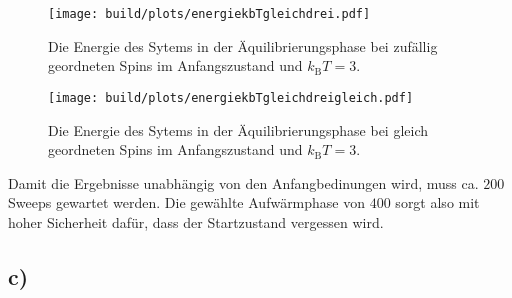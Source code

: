     \begin{figure*}
            \centering
            \begin{subfigure}[b]{0.475\textwidth}
                \centering
                \texttt{[image: build/plots/energiekbTgleichdrei.pdf]}
                \caption[Network2]%
                {{\small Die Energie des Sytems in der Äquilibrierungsphase bei zufällig geordneten Spins im Anfangszustand und $k_\text{B}T=3$.}}
                \label{fig:lcghist1}
            \end{subfigure}
            \hfill
            \begin{subfigure}[b]{0.475\textwidth}
                \centering
                \texttt{[image: build/plots/energiekbTgleichdreigleich.pdf]}
                \caption[]%
                {{\small Die Energie des Sytems in der Äquilibrierungsphase bei gleich geordneten Spins im Anfangszustand und $k_\text{B}T=3$.}}
                \label{fig:lcghist2}
            \end{subfigure}
        \end{figure*}

Damit die Ergebnisse unabhängig von den Anfangbedinungen wird, muss ca. $200$ Sweeps gewartet werden. Die gewählte Aufwärmphase von $400$
sorgt also mit hoher Sicherheit dafür, dass der Startzustand vergessen wird.

\subsection*{c)}

